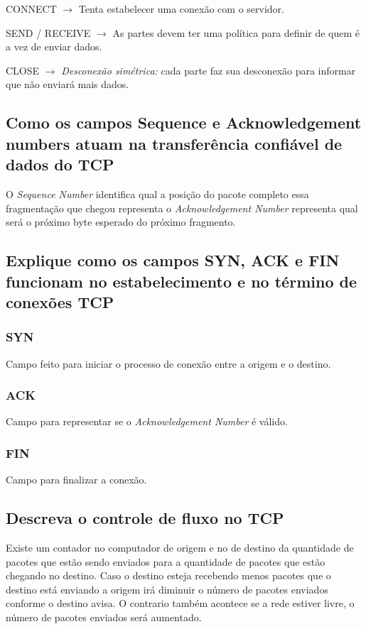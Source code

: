 CONNECT $\rightarrow$ Tenta estabelecer uma conexão
com o servidor.

SEND / RECEIVE $\rightarrow$ As partes devem ter uma política para
definir de quem é a vez de enviar dados.

CLOSE $\rightarrow$ \emph{Desconexão simétrica:} cada parte faz sua desconexão
para informar que não enviará mais dados.


\subsection{Como os campos Sequence e Acknowledgement numbers atuam na
transferência confiável de dados do TCP}

O \emph{Sequence Number} identifica qual a posição do pacote completo
essa fragmentação que chegou representa o \emph{Acknowledgement Number}
representa qual será o próximo byte esperado do próximo fragmento. 

\subsection{Explique como os campos SYN, ACK e FIN funcionam no estabelecimento e
no término de conexões TCP}

\subsubsection*{SYN}

Campo feito para iniciar o processo de conexão entre a origem e o destino.

\subsubsection*{ACK}

Campo para representar se o \emph{Acknowledgement Number} é válido.

\subsubsection*{FIN}

Campo para finalizar a conexão.

\subsection{Descreva o controle de fluxo no TCP}

Existe um contador no computador de origem e no de destino da quantidade de pacotes
que estão sendo enviados para a quantidade de pacotes que estão chegando no destino.
Caso o destino esteja recebendo menos pacotes que o destino está enviando a origem irá
diminuir o número de pacotes enviados conforme o destino avisa. O contrario também acontece
se a rede estiver livre, o número de pacotes enviados será aumentado.


